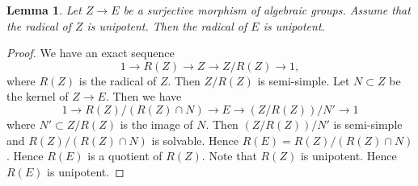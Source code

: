 \documentclass[11pt,english]{smfart}
\theoremstyle{plain}
\newtheorem{lem}[thm]{Lemma}
\theoremstyle{definition}
\theoremstyle{remark}
\numberwithin{equation}{subsection}
\theoremstyle{plain}
\begin{document}
\begin{lem}\label{lem:20221015}
Let $Z\to E$ be a surjective morphism of algebraic groups.
Assume that the radical of $Z$ is unipotent.
Then the radical of $E$ is unipotent.
\end{lem}

\begin{proof}
We have an exact sequence
$$
1\to R(Z)\to Z\to Z/R(Z)\to 1,
$$
where $R(Z)$ is the radical of $Z$.
Then $Z/R(Z)$ is semi-simple.
Let $N\subset Z$ be the kernel of $Z\to E$.
Then we have
$$
1\to R(Z)/(R(Z)\cap N)\to E\to (Z/R(Z))/N'\to 1
$$
where $N'\subset Z/R(Z)$ is the image of $N$.
Then $(Z/R(Z))/N'$ is semi-simple and $R(Z)/(R(Z)\cap N)$ is solvable.
Hence $R(E)=R(Z)/(R(Z)\cap N)$.
Hence $R(E)$ is a quotient of $R(Z)$.
Note that $R(Z)$ is unipotent.
Hence $R(E)$ is unipotent.
\end{proof}
\end{document}
